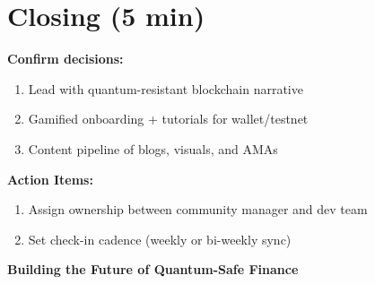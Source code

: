 \documentclass[11pt,a4paper]{article}
\begin{document}
\section{\checkmark Closing (5 min)}

\textbf{Confirm decisions:}
\begin{enumerate}
\item Lead with quantum-resistant blockchain narrative
\item Gamified onboarding + tutorials for wallet/testnet
\item Content pipeline of blogs, visuals, and AMAs
\end{enumerate}

\textbf{Action Items:}
\begin{enumerate}
\item Assign ownership between community manager and dev team
\item Set check-in cadence (weekly or bi-weekly sync)
\end{enumerate}

\vspace{1cm}
\begin{center}
\textbf{\Large Building the Future of Quantum-Safe Finance}
\end{center}
\end{document}
